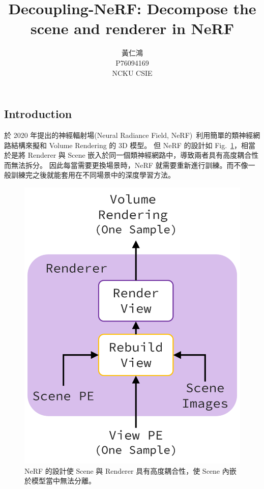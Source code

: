 \documentclass[10pt,twocolumn,letterpaper]{article}
\begin{document}
\begin{CJK}{UTF8}{bkai}
   \title{Decoupling-NeRF: Decompose the scene and renderer in NeRF}

   \author{
      黃仁鴻\\
      P76094169\\
      NCKU CSIE
   }

   \maketitle



   \section{Introduction}
   於 2020 年提出的神經輻射場(Neural Radiance Field,
   NeRF)~\cite{mildenhall2020nerf}利用簡單的類神經網路結構來擬和
   Volume Rendering 的 3D 模型。
   但 NeRF 的設計如 Fig.~\ref{fig:NeRF-is-content-coupling}，相當於是將
   Renderer 與 Scene 嵌入於同一個類神經網路中，導致兩者具有高度耦合性而無法拆分。
   因此每當需要更換場景時，NeRF 就需要重新進行訓練。而不像一般訓練完之後就能套用在不同場景中的深度學習方法。

   \begin{figure}[b]
      \begin{center}
         \includegraphics[width=0.8\linewidth]{img/NeRF-is-content-coupling.png}
      \end{center}
      \caption{
         NeRF 的設計使 Scene 與 Renderer 具有高度耦合性，使 Scene 內嵌於模型當中無法分離。
      }
      \label{fig:NeRF-is-content-coupling}
   \end{figure}


\end{CJK}
\end{document}
